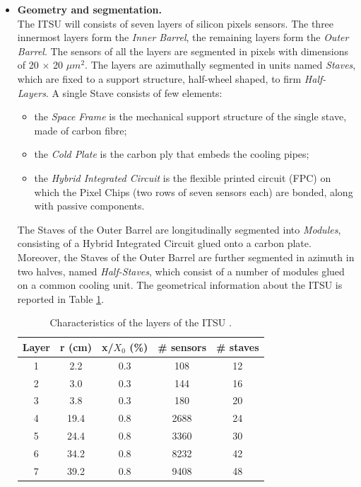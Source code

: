 \begin{itemize}
 \item \textbf{Geometry and segmentation.}\\
 The ITSU will consists of seven layers of silicon pixels sensors. The three innermost layers form the \textit{Inner Barrel}, the remaining layers form the \textit{Outer Barrel}. The sensors of all the layers are segmented in pixels with dimensions of 20 $\times$ 20 $\mu m^2$. The layers are azimuthally segmented in units named \textit{Staves}, which are fixed to a support structure, half-wheel shaped, to firm \textit{Half-Layers}. A single Stave consists of few elements:
 \begin{itemize}
  \item the \textit{Space Frame} is the mechanical support structure of the single stave, made of carbon fibre;
  \item the \textit{Cold Plate} is the carbon ply that embeds the cooling pipes;
  \item the \textit{Hybrid Integrated Circuit} is the flexible printed circuit (FPC) on which the Pixel Chips (two rows of seven sensors each) are bonded, along with passive components.
 \end{itemize}
 The Staves of the Outer Barrel are longitudinally segmented into \textit{Modules}, consisting of a Hybrid Integrated Circuit glued onto a carbon plate. Moreover, the Staves of the Outer Barrel are further segmented in azimuth in two halves, named \textit{Half-Staves}, which consist of a number of modules glued on a common cooling unit. The geometrical information about the ITSU is reported in Table \ref{tab:itsu}. 
\begin{table}
\centering
\renewcommand\arraystretch{1.5}
 \begin{tabular}{|c|c|c|c|c|}
  \hline
  Layer & r (cm) & x/$X_0$ (\%) & \# sensors & \# staves\\
  \hline
  1 & 2.2 & 0.3 & 108 & 12\\
  2 & 3.0 & 0.3 & 144 & 16\\
  3 & 3.8 & 0.3 & 180 & 20\\
  4 & 19.4 & 0.8 & 2688 & 24\\
  5 & 24.4 & 0.8 & 3360 & 30\\
  6 & 34.2 & 0.8 & 8232 & 42\\
  7 & 39.2 & 0.8 & 9408 & 48\\
  \hline
 \end{tabular}
 \caption{Characteristics of the layers of the ITSU \cite{uptdr}.}
 \label{tab:itsu}
\end{table}

\end{itemize}
